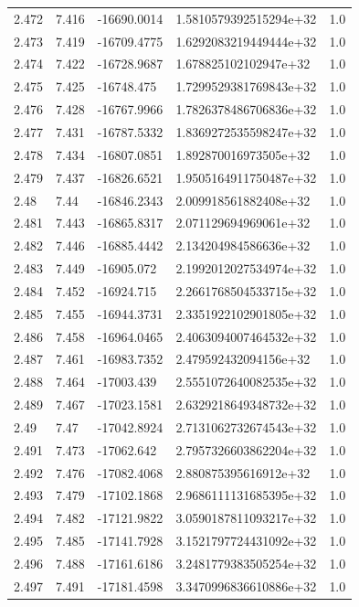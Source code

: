 \begin{tabular}{lllll}
2.472 & 7.416 & -16690.0014 & 1.5810579392515294e+32 & 1.0 \\
2.473 & 7.419 & -16709.4775 & 1.6292083219449444e+32 & 1.0 \\
2.474 & 7.422 & -16728.9687 & 1.678825102102947e+32 & 1.0 \\
2.475 & 7.425 & -16748.475 & 1.7299529381769843e+32 & 1.0 \\
2.476 & 7.428 & -16767.9966 & 1.7826378486706836e+32 & 1.0 \\
2.477 & 7.431 & -16787.5332 & 1.8369272535598247e+32 & 1.0 \\
2.478 & 7.434 & -16807.0851 & 1.892870016973505e+32 & 1.0 \\
2.479 & 7.437 & -16826.6521 & 1.9505164911750487e+32 & 1.0 \\
2.48 & 7.44 & -16846.2343 & 2.009918561882408e+32 & 1.0 \\
2.481 & 7.443 & -16865.8317 & 2.071129694969061e+32 & 1.0 \\
2.482 & 7.446 & -16885.4442 & 2.134204984586636e+32 & 1.0 \\
2.483 & 7.449 & -16905.072 & 2.1992012027534974e+32 & 1.0 \\
2.484 & 7.452 & -16924.715 & 2.2661768504533715e+32 & 1.0 \\
2.485 & 7.455 & -16944.3731 & 2.3351922102901805e+32 & 1.0 \\
2.486 & 7.458 & -16964.0465 & 2.4063094007464532e+32 & 1.0 \\
2.487 & 7.461 & -16983.7352 & 2.479592432094156e+32 & 1.0 \\
2.488 & 7.464 & -17003.439 & 2.5551072640082535e+32 & 1.0 \\
2.489 & 7.467 & -17023.1581 & 2.6329218649348732e+32 & 1.0 \\
2.49 & 7.47 & -17042.8924 & 2.7131062732674543e+32 & 1.0 \\
2.491 & 7.473 & -17062.642 & 2.7957326603862204e+32 & 1.0 \\
2.492 & 7.476 & -17082.4068 & 2.880875395616912e+32 & 1.0 \\
2.493 & 7.479 & -17102.1868 & 2.9686111131685395e+32 & 1.0 \\
2.494 & 7.482 & -17121.9822 & 3.0590187811093217e+32 & 1.0 \\
2.495 & 7.485 & -17141.7928 & 3.1521797724431092e+32 & 1.0 \\
2.496 & 7.488 & -17161.6186 & 3.2481779383505254e+32 & 1.0 \\
2.497 & 7.491 & -17181.4598 & 3.3470996836610886e+32 & 1.0 \\

\end{tabular}
